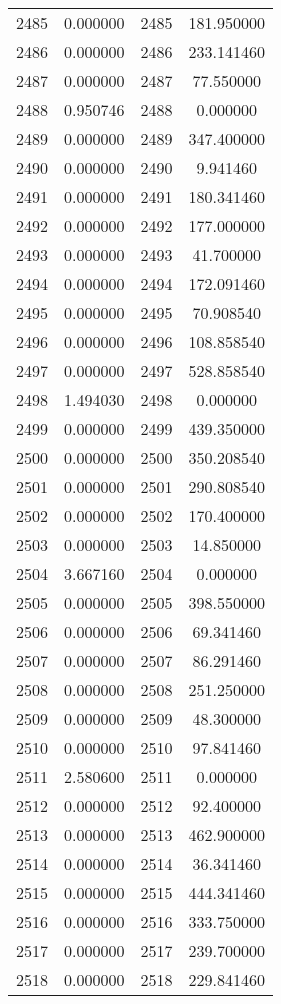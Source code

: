 \documentclass[12pt]{article}
\begin{document}
\begin{longtable}{@{}cccc@{}}
2485 & 0.000000 & 2485 & 181.950000 \\
2486 & 0.000000 & 2486 & 233.141460 \\
2487 & 0.000000 & 2487 & 77.550000 \\
2488 & 0.950746 & 2488 & 0.000000 \\
2489 & 0.000000 & 2489 & 347.400000 \\
2490 & 0.000000 & 2490 & 9.941460 \\
2491 & 0.000000 & 2491 & 180.341460 \\
2492 & 0.000000 & 2492 & 177.000000 \\
2493 & 0.000000 & 2493 & 41.700000 \\
2494 & 0.000000 & 2494 & 172.091460 \\
2495 & 0.000000 & 2495 & 70.908540 \\
2496 & 0.000000 & 2496 & 108.858540 \\
2497 & 0.000000 & 2497 & 528.858540 \\
2498 & 1.494030 & 2498 & 0.000000 \\
2499 & 0.000000 & 2499 & 439.350000 \\
2500 & 0.000000 & 2500 & 350.208540 \\
2501 & 0.000000 & 2501 & 290.808540 \\
2502 & 0.000000 & 2502 & 170.400000 \\
2503 & 0.000000 & 2503 & 14.850000 \\
2504 & 3.667160 & 2504 & 0.000000 \\
2505 & 0.000000 & 2505 & 398.550000 \\
2506 & 0.000000 & 2506 & 69.341460 \\
2507 & 0.000000 & 2507 & 86.291460 \\
2508 & 0.000000 & 2508 & 251.250000 \\
2509 & 0.000000 & 2509 & 48.300000 \\
2510 & 0.000000 & 2510 & 97.841460 \\
2511 & 2.580600 & 2511 & 0.000000 \\
2512 & 0.000000 & 2512 & 92.400000 \\
2513 & 0.000000 & 2513 & 462.900000 \\
2514 & 0.000000 & 2514 & 36.341460 \\
2515 & 0.000000 & 2515 & 444.341460 \\
2516 & 0.000000 & 2516 & 333.750000 \\
2517 & 0.000000 & 2517 & 239.700000 \\
2518 & 0.000000 & 2518 & 229.841460 \\

\end{longtable}
\end{document}
